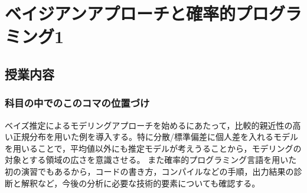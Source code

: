 \section{ベイジアンアプローチと確率的プログラミング1}
\subsection{授業内容}
\subsubsection{科目の中でのこのコマの位置づけ}
ベイズ推定によるモデリングアプローチを始めるにあたって，比較的親近性の高い正規分布を用いた例を導入する。特に分散/標準偏差に個人差を入れるモデルを用いることで，平均値以外にも推定モデルが考えうることから，モデリングの対象とする領域の広さを意識させる。
また確率的プログラミング言語を用いた初の演習でもあるから，コードの書き方，コンパイルなどの手順，出力結果の診断と解釈など，今後の分析に必要な技術的要素についても確認する。

